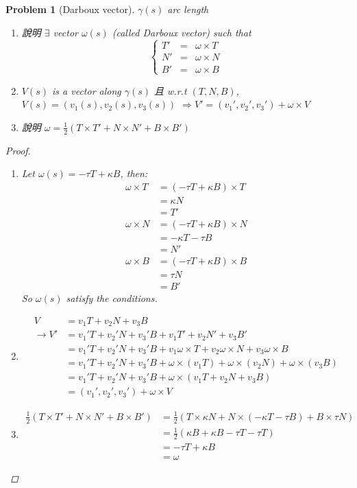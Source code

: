 \documentclass[10pt,a4paper]{article}
\newcounter{theProblemCounter}
\newtheorem{problem}[theProblemCounter]{Problem}
\begin{document}
\setcounter{theProblemCounter}{4}
\begin{problem}[Darboux vector]
$\gamma(s)$ arc length
\begin{enumerate}
\item[(a)] 說明 $\exists$ vector $\omega(s)$ (called \emph{Darboux vector}) such that 
\[
\left\{
\begin{array}{ccc}
T' &=& \omega\times T\\
N' &=& \omega\times N\\
B' &=& \omega\times B\end{array}
\right.
\]
\item[(b)] $V(s)$ is a vector along $\gamma(s)$ 且 w.r.t $(T, N,B)$, $V(s)=(v_1(s), v_2(s), v_3(s))$ $\Rightarrow V' = (v_1', v_2', v_3') + \omega \times V$
\item[(c)] 說明 $\omega=\frac12 (T\times T' + N\times N' + B\times B')$
\end{enumerate}
\begin{proof}
\begin{enumerate}
\item[(a)]
Let $\omega(s)=-\tau T+\kappa B$, then:
\begin{align*}
\omega\times T &= \left(-\tau T+\kappa B\right)\times T\\
&=\kappa N\\
&=T'\\
\omega\times N &= \left(-\tau T+\kappa B\right)\times N\\
&=-\kappa T-\tau B\\
&=N'\\
\omega\times B &= \left(-\tau T+\kappa B\right)\times B\\
&=\tau N\\
&=B'
\end{align*}
So $\omega(s)$ satisfy the conditions.
\item[(b)]
\begin{align*}
V&=v_1 T+v_2 N+v_3 B\\
\rightarrow V'&=v_1' T+v_2' N+v_3' B+v_1 T'+v_2 N'+v_3 B'\\
&=v_1' T+v_2' N+v_3' B+v_1\omega\times T+v_2\omega\times N+v_3\omega\times B\\
&=v_1' T+v_2' N+v_3' B+\omega\times\left(v_1T\right)+\omega\times\left(v_2N\right)+\omega\times\left(v_3B\right)\\
&=v_1' T+v_2' N+v_3' B+\omega\times\left(v_1T+v_2N+v_3B\right)\\
&=\left(v_1',v_2',v_3'\right)+\omega\times V
\end{align*}
\item[(c)]
\begin{align*}
\frac12 (T\times T' + N\times N' + B\times B')&=\frac12 (T\times \kappa N + N\times\left(-\kappa T-\tau B\right) + B\times \tau N)\\
&=\frac12 (\kappa B + \kappa B-\tau T - \tau T)\\
&= -\tau T+\kappa B\\
&=\omega
\end{align*}
\end{enumerate}
\end{proof}
\end{problem}
\end{document}
